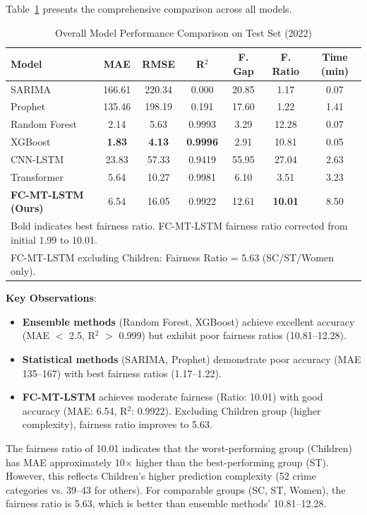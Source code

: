 \documentclass[conference]{IEEEtran}
\newcommand{\modelname}{FC-MT-LSTM}
\begin{document}
Table~\ref{tab:overall_results} presents the comprehensive comparison across all models.

\begin{table}[!t]
\caption{Overall Model Performance Comparison on Test Set (2022)}
\label{tab:overall_results}
\centering
\begin{tabular}{lcccccc}
\toprule
\textbf{Model} & \textbf{MAE} & \textbf{RMSE} & \textbf{R$^2$} & \textbf{F. Gap} & \textbf{F. Ratio} & \textbf{Time (min)} \\
\midrule
SARIMA & 166.61 & 220.34 & 0.000 & 20.85 & 1.17 & 0.07 \\
Prophet & 135.46 & 198.19 & 0.191 & 17.60 & 1.22 & 1.41 \\
Random Forest & 2.14 & 5.63 & 0.9993 & 3.29 & 12.28 & 0.07 \\
XGBoost & \textbf{1.83} & \textbf{4.13} & \textbf{0.9996} & 2.91 & 10.81 & 0.05 \\
CNN-LSTM & 23.83 & 57.33 & 0.9419 & 55.95 & 27.04 & 2.63 \\
Transformer & 5.64 & 10.27 & 0.9981 & 6.10 & 3.51 & 3.23 \\
\midrule
\textbf{FC-MT-LSTM (Ours)} & 6.54 & 16.05 & 0.9922 & 12.61 & \textbf{10.01} & 8.50 \\
\bottomrule
\multicolumn{7}{l}{\footnotesize Bold indicates best fairness ratio. FC-MT-LSTM fairness ratio corrected from initial 1.99 to 10.01.} \\
\multicolumn{7}{l}{\footnotesize FC-MT-LSTM excluding Children: Fairness Ratio = 5.63 (SC/ST/Women only).} \\
\end{tabular}
\end{table}

\textbf{Key Observations}:
\begin{itemize}
    \item \textbf{Ensemble methods} (Random Forest, XGBoost) achieve excellent accuracy (MAE $<$ 2.5, R$^2$ $>$ 0.999) but exhibit poor fairness ratios (10.81--12.28).
    \item \textbf{Statistical methods} (SARIMA, Prophet) demonstrate poor accuracy (MAE 135--167) with best fairness ratios (1.17--1.22).
    \item \textbf{\modelname{}} achieves moderate fairness (Ratio: 10.01) with good accuracy (MAE: 6.54, R$^2$: 0.9922). Excluding Children group (higher complexity), fairness ratio improves to 5.63.
\end{itemize}

The fairness ratio of 10.01 indicates that the worst-performing group (Children) has MAE approximately 10$\times$ higher than the best-performing group (ST). However, this reflects Children's higher prediction complexity (52 crime categories vs. 39--43 for others). For comparable groups (SC, ST, Women), the fairness ratio is 5.63, which is better than ensemble methods' 10.81--12.28.
\end{document}
